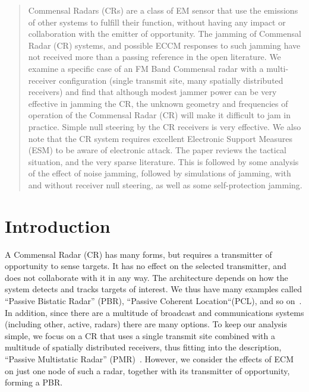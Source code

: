\documentclass[conference]{IEEEtran}
\begin{document}
\begin{abstract}
Commensal Radars (CRs) are a class of EM sensor that use the emissions of other systems to fulfill their function, without having any impact or collaboration with the emitter of opportunity. The jamming of Commensal Radar (CR) systems, and possible ECCM responses to such jamming have not received more than a passing reference in the open literature. We examine a specific case of an FM Band Commensal radar with a multi-receiver configuration (single transmit site, many spatially distributed receivers) and find that although modest jammer power can be very effective in jamming the CR, the unknown geometry and frequencies of operation of the Commensal Radar (CR) will make it difficult to jam in practice. Simple null steering by the CR receivers is very effective. We also note that the CR system requires excellent Electronic Support Measures (ESM) to be aware of electronic attack. The paper reviews the tactical situation, and the very sparse literature. This is followed by some analysis of the effect of noise jamming, followed by simulations of jamming, with and without receiver null steering, as well as some self-protection jamming.
\end{abstract}

%
\IEEEpeerreviewmaketitle


\section{Introduction}
A Commensal Radar (CR)  has many forms, but requires a transmitter of opportunity to sense targets. It has no effect on the selected transmitter, and does not collaborate with it in any way. The architecture depends on how the system detects and tracks targets of interest. We thus have many examples called ``Passive Bistatic Radar'' (PBR), ``Passive Coherent Location``(PCL), and so on~\cite{willis:07, baugh:03}. In addition, since there are a multitude of broadcast and communications systems (including other, active, radars) there are many options. To keep our analysis simple, we focus on a CR  that uses a single transmit site combined with a multitude of spatially distributed receivers, thus fitting into the description, ``Passive Multistatic Radar'' (PMR)~\cite[Chapter 6]{willis:07}. However, we consider the effects of ECM on just one node of such a radar, together with its transmitter of opportunity, forming a PBR.
\end{document}
